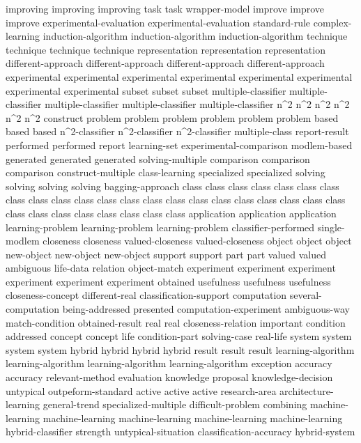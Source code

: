improving	improving	improving	
task	task	
wrapper-model	
improve	improve	improve	
experimental-evaluation	experimental-evaluation	
standard-rule	
complex-learning	
induction-algorithm	induction-algorithm	induction-algorithm	
technique	technique	technique	technique	
representation	representation	representation	
different-approach	different-approach	different-approach	different-approach	
experimental	experimental	experimental	experimental	experimental	experimental	experimental	experimental	
subset	subset	subset	
multiple-classifier	multiple-classifier	multiple-classifier	multiple-classifier	multiple-classifier	
n^2	n^2	n^2	n^2	n^2	n^2	
construct	
problem	problem	problem	problem	problem	problem	
based	based	based	
n^2-classifier	n^2-classifier	n^2-classifier	
multiple-class	
report-result	
performed	performed	
report	
learning-set	
experimental-comparison	
modlem-based	
generated	generated	generated	
solving-multiple	
comparison	comparison	comparison	
construct-multiple	
class-learning	
specialized	specialized	
solving	solving	solving	solving	
bagging-approach	
class	class	class	class	class	class	class	class	class	class	class	class	class	class	class	class	class	class	class	class	class	class	class	class	class	class	class	class	class	class	
application	application	application	
learning-problem	learning-problem	learning-problem	
classifier-performed	
single-modlem	
closeness	closeness	
valued-closeness	valued-closeness	
object	object	object	
new-object	new-object	new-object	
support	support	
part	part	
valued	valued	
ambiguous	
life-data	
relation	
object-match	
experiment	experiment	experiment	experiment	experiment	experiment	
obtained	
usefulness	usefulness	usefulness	
closeness-concept	
different-real	
classification-support	
computation	
several-computation	
being-addressed	
presented	
computation-experiment	
ambiguous-way	
match-condition	
obtained-result	
real	real	
closeness-relation	
important	
condition	
addressed	
concept	concept	
life	
condition-part	
solving-case	
real-life	
system	system	system	system	
hybrid	hybrid	hybrid	hybrid	
result	result	result	
learning-algorithm	learning-algorithm	learning-algorithm	learning-algorithm	
exception	
accuracy	accuracy	
relevant-method	
evaluation	
knowledge	
proposal	
knowledge-decision	
untypical	
outpeform-standard	
active	active	active	
research-area	
architecture-learning	
general-trend	
specialized-multiple	
difficult-problem	
combining	
machine-learning	machine-learning	machine-learning	machine-learning	machine-learning	
hybrid-classifier	
strength	
untypical-situation	
classification-accuracy	
hybrid-system	
